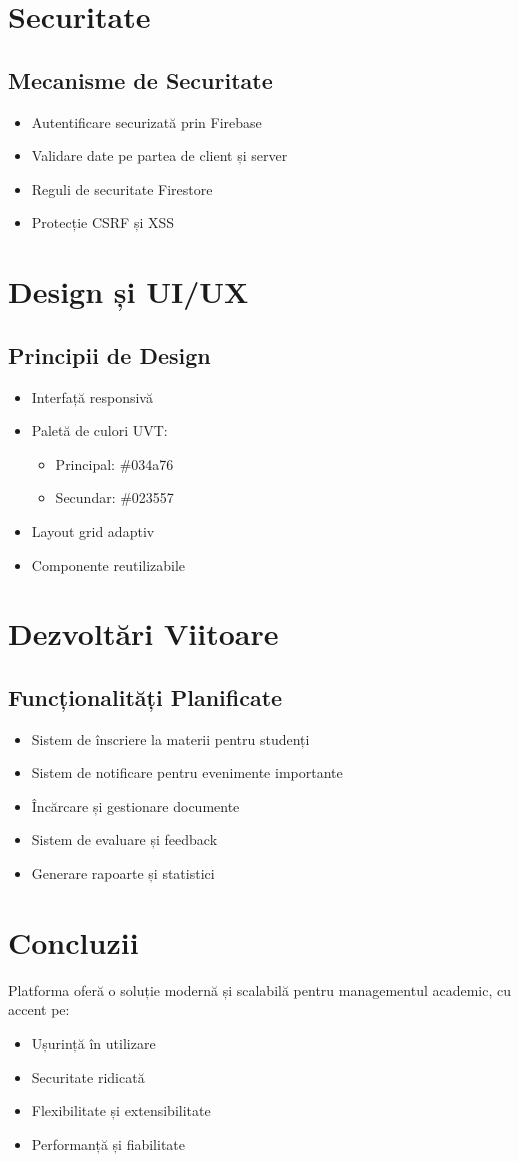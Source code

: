 \documentclass[12pt,a4paper]{article}
\begin{document}
\section{Securitate}
\subsection{Mecanisme de Securitate}
\begin{itemize}
    \item Autentificare securizată prin Firebase
    \item Validare date pe partea de client și server
    \item Reguli de securitate Firestore
    \item Protecție CSRF și XSS
\end{itemize}

\section{Design și UI/UX}
\subsection{Principii de Design}
\begin{itemize}
    \item Interfață responsivă
    \item Paletă de culori UVT:
    \begin{itemize}
        \item Principal: \#034a76
        \item Secundar: \#023557
    \end{itemize}
    \item Layout grid adaptiv
    \item Componente reutilizabile
\end{itemize}

\section{Dezvoltări Viitoare}
\subsection{Funcționalități Planificate}
\begin{itemize}
    \item Sistem de înscriere la materii pentru studenți
    \item Sistem de notificare pentru evenimente importante
    \item Încărcare și gestionare documente
    \item Sistem de evaluare și feedback
    \item Generare rapoarte și statistici
\end{itemize}

\section{Concluzii}
Platforma oferă o soluție modernă și scalabilă pentru managementul academic, cu accent pe:
\begin{itemize}
    \item Ușurință în utilizare
    \item Securitate ridicată
    \item Flexibilitate și extensibilitate
    \item Performanță și fiabilitate
\end{itemize}
\end{document}
